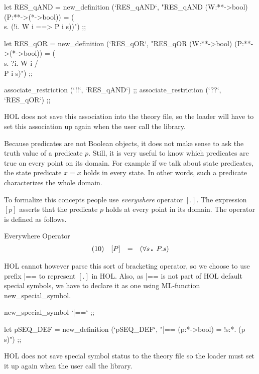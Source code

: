 let RES_qAND = new_definition (`RES_qAND`,
   "RES_qAND (W:**->bool) (P:**->(*->bool)) = (\\s. (!i. W i ==> P i s))") ;;

let RES_qOR = new_definition (`RES_qOR`, 
   "RES_qOR (W:**->bool) (P:**->(*->bool)) = (\\s. ?i. W i /\\  P i s)") ;;

associate_restriction (`!!`, `RES_qAND`) ;;
associate_restriction (`??`, `RES_qOR`) ;;
\endcode
{}


\NOTE HOL does not save this association into the theory file, so the
loader will have to set this association up again when the user call
the library.

Because predicates are not Boolean objects, it does not make sense to
ask the truth value of a predicate $p$.  Still, it is very useful to
know which predicates are true on every point on its domain. For
example if we talk about state predicates, the state predicate $x=x$
holds in every state. In other words, such a predicate characterizes
the whole domain.

To formalize this concepts people use {\em everywhere} operator $[.]$.
The expression $[p]$ asserts that the predicate $p$ holds at every
point in its domain. The operator is defined as follows.

\begin{definition}{Everywhere Operator}
\[ \begin{array}{llcl}
   (10) & [P] & = & (\qA s\Dot  P.s) 
   \end{array} \]
\end{definition}

HOL cannot however parse this sort of bracketing operator, so we
choose to use prefix \code{}|==\edoc{} to represent $[.]$ in HOL. Also, as
\code{}|==\edoc{} is not part of HOL default special symbols, we have to declare
it as one using ML-function \code{}new_special_symbol\edoc{}.

\enddocs
{}
\endmoddef
new_special_symbol `|==` ;;

let pSEQ_DEF = new_definition
  (`pSEQ_DEF`, "|== (p:*->bool) = !s:*. (p s)") ;;
\endcode
{}


\NOTE HOL does not save special symbol status to the theory file so
the loader must set it up again when the user call the library.









